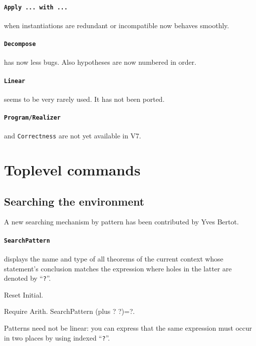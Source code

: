 \documentclass[11pt]{article}
\begin{document}
  \paragraph{{\tt Apply ... with ...}} when instantiations are
  redundant or incompatible now behaves smoothly.

  \paragraph{{\tt Decompose}} has now less bugs. Also hypotheses
  are now numbered in order.

  \paragraph{{\tt Linear}} seems to be very rarely used. It has not
  been ported.

  \paragraph{{\tt Program/Realizer}} and {\tt Correctness} are not yet
  available in {\Coq} V7.

\section{Toplevel commands}

\subsection{Searching the environment}
\label{Search}
A new searching mechanism by pattern has been contributed by Yves Bertot.


\paragraph{{\tt SearchPattern {\term}}}
displays the name and type of all theorems of the current
context whose statement's conclusion matches the expression {\term}
where holes in the latter are denoted by ``{\tt ?}''.

\begin{coq_eval}
Reset Initial.
\end{coq_eval}
\begin{coq_example}
Require Arith.
SearchPattern (plus ? ?)=?.
\end{coq_example}

Patterns need not be linear: you can express that the same
expression must occur in two places by using indexed ``{\tt ?}''.
\end{document}
